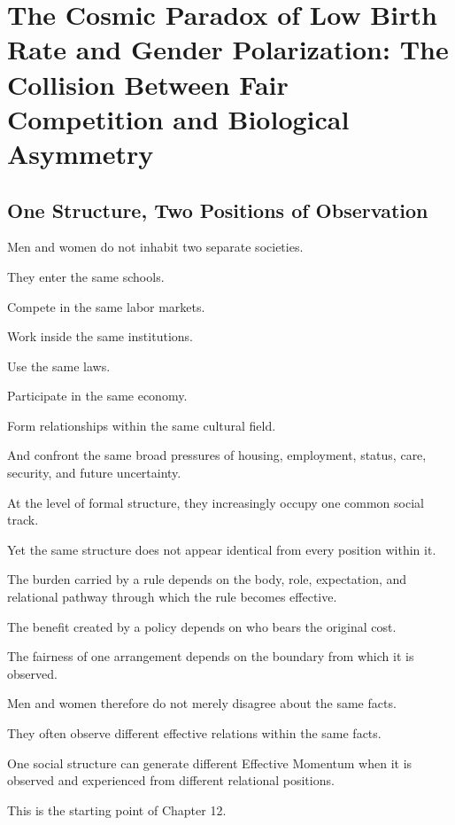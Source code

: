 

\section{The Cosmic Paradox of Low Birth Rate and Gender Polarization: The Collision Between Fair Competition and Biological Asymmetry}

\subsection*{\textbf{One Structure, Two Positions of Observation}}

Men and women do not inhabit two separate societies.

They enter the same schools.

Compete in the same labor markets.

Work inside the same institutions.

Use the same laws.

Participate in the same economy.

Form relationships within the same cultural field.

And confront the same broad pressures of housing, employment, status, care, security, and future uncertainty.

At the level of formal structure, they increasingly occupy one common social track.

Yet the same structure does not appear identical from every position within it.

The burden carried by a rule depends on the body, role, expectation, and relational pathway through which the rule becomes effective.

The benefit created by a policy depends on who bears the original cost.

The fairness of one arrangement depends on the boundary from which it is observed.

Men and women therefore do not merely disagree about the same facts.

They often observe different effective relations within the same facts.

One social structure can generate different Effective Momentum when it is observed and experienced from different relational positions.

This is the starting point of Chapter 12.

